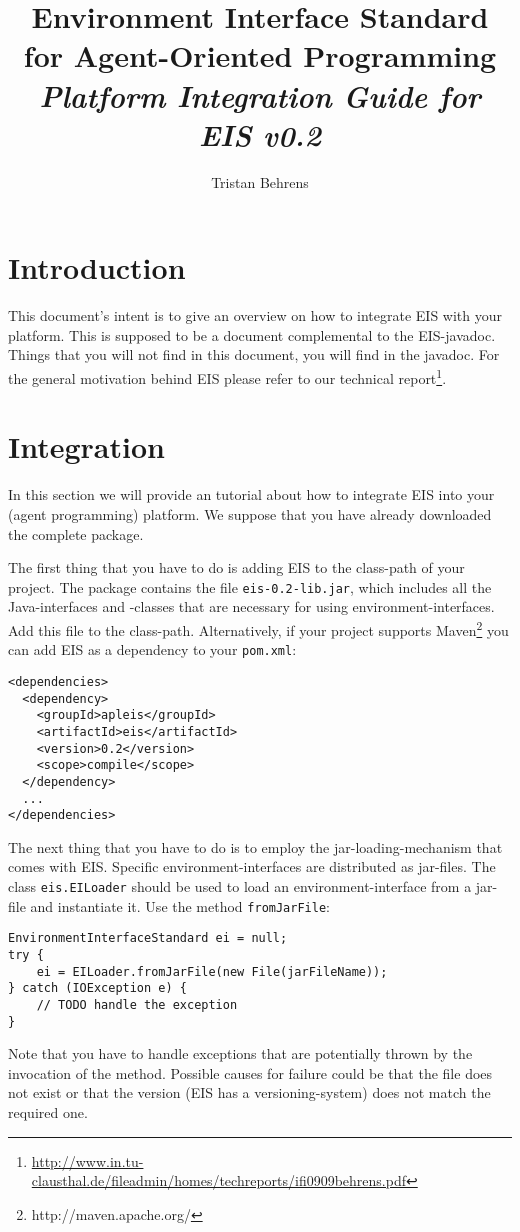 \documentclass[a4]{article}
\newcommand{\EIS}{\textsf{EIS}\xspace}
\begin{document}
\title{Environment Interface Standard for Agent-Oriented Programming \\
\textit{Platform Integration Guide for EIS v0.2}
}

\author{Tristan Behrens}

\maketitle

\section{Introduction}

This document's intent is to give an overview on how to integrate \EIS with your platform. This is supposed to be a document complemental to the \EIS-javadoc. Things that you will not find
in this document, you will find in the javadoc. For the general motivation behind \EIS please refer
to our technical report\footnote{\url{http://www.in.tu-clausthal.de/fileadmin/homes/techreports/ifi0909behrens.pdf}}.


\section{Integration}

In this section we will provide an tutorial about how to integrate \EIS into your (agent programming) platform. 
We suppose that you have already downloaded the complete package. 

The first thing that you have to do is adding \EIS to the class-path of your project.
The package contains the file \texttt{eis-0.2-lib.jar}, which includes all the Java-interfaces and -classes that are necessary for using environment-interfaces. Add this file to the class-path. Alternatively, if your project supports  
Maven\footnote{http://maven.apache.org/} you can add \EIS as a dependency to your \texttt{pom.xml}:
\begin{verbatim}
<dependencies>
  <dependency>
    <groupId>apleis</groupId> 
    <artifactId>eis</artifactId> 
    <version>0.2</version> 
    <scope>compile</scope>
  </dependency>
  ...
</dependencies>
\end{verbatim}

The next thing that you have to do is to employ the jar-loading-mechanism that comes with \EIS. 
Specific environment-interfaces are distributed as jar-files. 
The class \texttt{eis.EILoader} should be used to load an environment-interface from a jar-file and instantiate it.
Use the method \texttt{fromJarFile}:
\begin{verbatim}
EnvironmentInterfaceStandard ei = null;
try {
    ei = EILoader.fromJarFile(new File(jarFileName));
} catch (IOException e) {
    // TODO handle the exception
}
\end{verbatim}
Note that you have to handle exceptions that are potentially thrown by the invocation of the method. 
Possible causes for failure could be that the file does not exist or that the version (\EIS has a versioning-system) does not match the required one.
\end{document}
